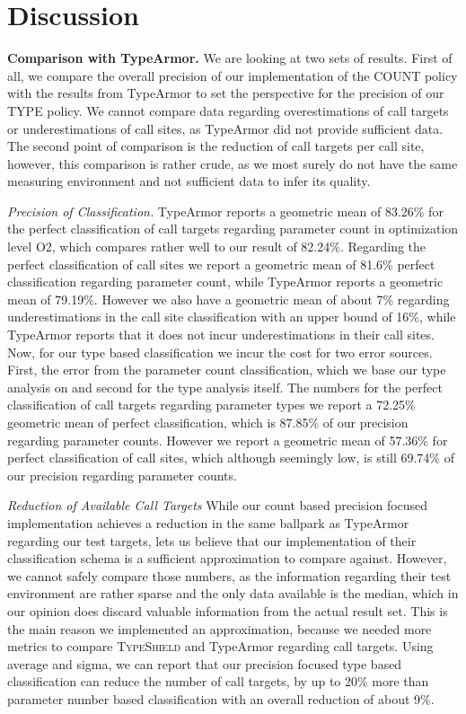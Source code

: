 \section{Discussion}
\label{chapter:Discussion}

\textbf{Comparison with TypeArmor.}
\label{section:comptype}
We are looking at two sets of results. First of all, we compare the overall precision of our implementation
of the COUNT policy with the results from TypeArmor to set the perspective for the precision of our TYPE 
policy. We cannot compare data regarding overestimations of call targets or underestimations of call sites, 
as TypeArmor did not provide sufficient data. The second point of comparison is the reduction of call targets
per call site, however, this comparison is rather crude, as we most surely do not have the same measuring
environment and not sufficient data to infer its quality.

\textit{Precision of Classification.}
TypeArmor reports a geometric mean of 83.26\% for the perfect classification of call targets regarding 
parameter count in optimization level O2, which compares rather well to our result of 82.24\%. Regarding
the perfect classification of call sites we report a geometric mean of 81.6\% perfect classification 
regarding parameter count, while TypeArmor reports a geometric mean of 79.19\%. However we also have
a geometric mean of about 7\% regarding underestimations in the call site classification with an upper
bound of 16\%, while TypeArmor reports that it does not incur underestimations in their call sites.
Now, for our type based classification we incur the cost for two error sources. First, the error from
the parameter count classification, which we base our type analysis on and second for the type analysis
itself. The numbers for the perfect classification of call targets regarding parameter types we report a
72.25\% geometric mean of perfect classification, which is 87.85\% of our precision regarding parameter
counts. However we report a geometric mean of 57.36\%
for perfect classification of call sites, which although seemingly low, is still 69.74\% of our precision
regarding parameter counts.

\textit{Reduction of Available Call Targets}
While our count based precision focused implementation achieves a reduction in the same ballpark as
TypeArmor regarding our test targets, lets us believe that our implementation of their classification
schema is a sufficient approximation to compare against. However, we cannot safely compare those numbers,
as the information regarding their test environment are rather sparse and the only data available is the
median, which in our opinion does discard valuable information from the actual result set. This is the
main reason we implemented an approximation, because we needed more metrics to compare \textsc{TypeShield}
and TypeArmor regarding call targets. Using average and sigma, we can report that our precision focused
type based classification can reduce the number of call targets, by up to 20\% more than parameter number
based classification with an overall reduction of about 9\%.


